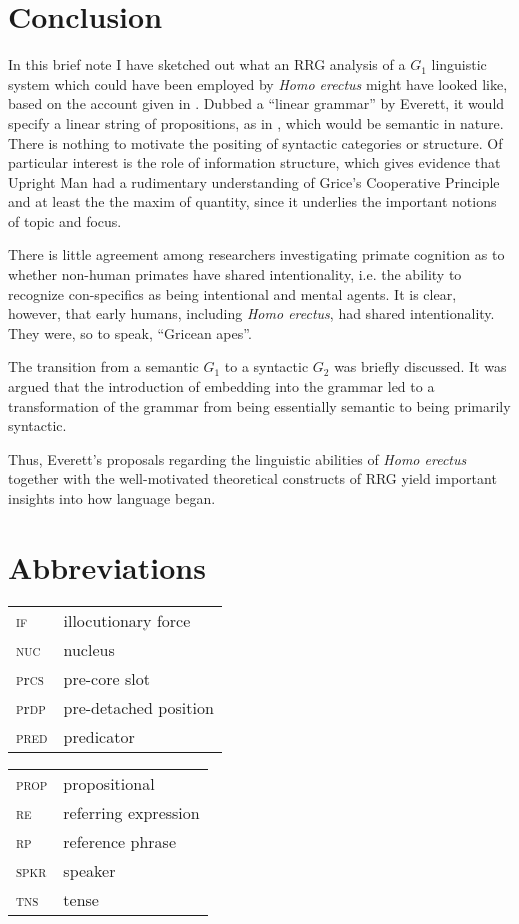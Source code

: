 \documentclass[output=paper,colorlinks,citecolor=brown]{langscibook}
\begin{document}
\section{Conclusion}\label{sec:vanvalin:6}
In this brief note I have sketched out what an RRG analysis of a $G_1$ linguistic system which could have been employed by \emph{Homo erectus} might have looked like, based on the account given in \citet{everett2017language}.  Dubbed a “linear grammar” by Everett, it would specify a linear string of propositions, as in , which would be semantic in nature.  There is nothing to motivate the positing of syntactic categories or structure.  Of particular interest is the role of information structure, which gives evidence that Upright Man had a rudimentary understanding of Grice’s Cooperative Principle and at least the the maxim of quantity, since it underlies the important notions of topic and focus.  

There is little agreement among researchers investigating primate cognition as to whether non-human primates have shared intentionality, i.e. the ability to recognize con-specifics as being intentional and mental agents.  It is clear, however, that early humans, including \emph{Homo erectus}, had shared intentionality.  They were, so to speak, “Gricean apes”.

The transition from a semantic $G_1$ to a syntactic $G_2$ was briefly discussed.  It was argued that the introduction of embedding into the grammar led to a transformation of the grammar from being essentially semantic to being primarily syntactic.

Thus, Everett’s proposals regarding the linguistic abilities of \emph{Homo erectus} together with the well-motivated theoretical constructs of RRG yield important insights into how language began.

\section*{Abbreviations}
\begin{tabularx}{.5\textwidth}{@{}lQ}
\textsc{if} & illocutionary force \\
\textsc{nuc} & nucleus \\
\textsc{p}r\textsc{cs} & pre-core slot \\
\textsc{p}r\textsc{dp} & pre-detached position \\
\textsc{pred} & predicator \\
\end{tabularx}\begin{tabularx}{.5\textwidth}{lQ@{}}
\textsc{prop} & propositional \\
\textsc{re} & referring expression \\
\textsc{rp} & reference phrase \\
\textsc{spkr} & speaker \\
\textsc{tns} & tense \\
\end{tabularx}

\printbibliography[heading=subbibliography,notkeyword=this]
\end{document}
